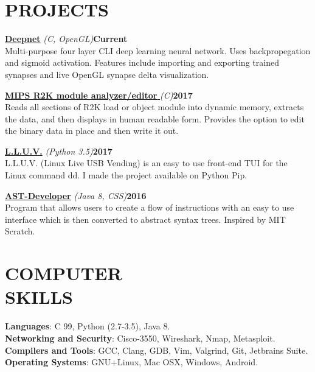 \documentclass[line,margin]{res}
\begin{document}
\begin{resume}
\section{PROJECTS}
\par
    \href{https://github.com/jmp1617/deepnet.git}{\textbf{Deepnet}}
    {\sl (C, OpenGL)}\hfill \textbf{Current}\\ 
    Multi-purpose four layer CLI deep learning neural network. Uses
    backpropegation and sigmoid activation. Features include importing and 
    exporting trained synapses and live OpenGL synapse delta visualization.
\par
    \href{https://github.com/jmp1617/lmedit.git}
    {\textbf{MIPS R2K module analyzer/editor }}{\sl (C)}\hfill \textbf{2017}\\
    Reads all sections of R2K load or object module into dynamic memory, 
    extracts the data, and then displays in human readable form. Provides the 
    option to edit the binary data in place and then write it out.
\par
    \href{https://github.com/jmp1617/LLUV.git}{\textbf{L.L.U.V.}}
    {\sl (Python 3.5)}\hfill \textbf{2017}\\ 
    L.L.U.V. (Linux Live USB Vending) is an easy to use front-end TUI for the 
    Linux command dd. I made the project available on Python Pip.
\par
    \href{https://github.com/jmp1617/ast-developer.git}{\textbf{AST-Developer}}
    {\sl (Java 8, CSS)}\hfill \textbf{2016}\\ 
    Program that allows users to create a flow of instructions with an easy to
    use interface which is then converted to abstract syntax trees. Inspired by 
    MIT Scratch.

\section{COMPUTER\\SKILLS}
\textbf{Languages}: C 99, Python (2.7-3.5), Java 8.
\\
\textbf{Networking and Security}: Cisco-3550, Wireshark, Nmap, Metasploit.  
\\
\textbf{Compilers and Tools}: GCC, Clang, GDB, Vim, Valgrind, Git, 
Jetbrains Suite. 
\\
\textbf{Operating Systems}: 
GNU+Linux, Mac OSX, Windows, Android.


\end{resume}
\end{document}
